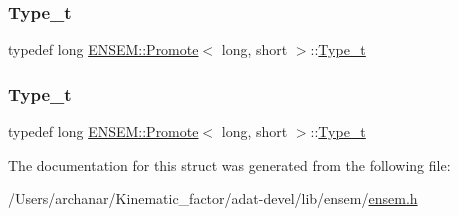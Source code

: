 \mbox{\label{structENSEM_1_1Promote_3_01long_00_01short_01_4_ad4dfbe27e4b99b58da27d3d26440cb0c}} 
\subsubsection{\texorpdfstring{Type\_t}{Type\_t}\hspace{0.1cm}{\footnotesize\ttfamily [2/3]}}
{\footnotesize\ttfamily typedef long \mbox{\hyperlink{structENSEM_1_1Promote}{E\+N\+S\+E\+M\+::\+Promote}}$<$ long, short $>$\+::\mbox{\hyperlink{structENSEM_1_1Promote_3_01long_00_01short_01_4_ad4dfbe27e4b99b58da27d3d26440cb0c}{Type\+\_\+t}}}

\mbox{\label{structENSEM_1_1Promote_3_01long_00_01short_01_4_ad4dfbe27e4b99b58da27d3d26440cb0c}} 
\subsubsection{\texorpdfstring{Type\_t}{Type\_t}\hspace{0.1cm}{\footnotesize\ttfamily [3/3]}}
{\footnotesize\ttfamily typedef long \mbox{\hyperlink{structENSEM_1_1Promote}{E\+N\+S\+E\+M\+::\+Promote}}$<$ long, short $>$\+::\mbox{\hyperlink{structENSEM_1_1Promote_3_01long_00_01short_01_4_ad4dfbe27e4b99b58da27d3d26440cb0c}{Type\+\_\+t}}}



The documentation for this struct was generated from the following file\+:\begin{DoxyCompactItemize}
\item 
/\+Users/archanar/\+Kinematic\+\_\+factor/adat-\/devel/lib/ensem/\mbox{\hyperlink{adat-devel_2lib_2ensem_2ensem_8h}{ensem.\+h}}\end{DoxyCompactItemize}

